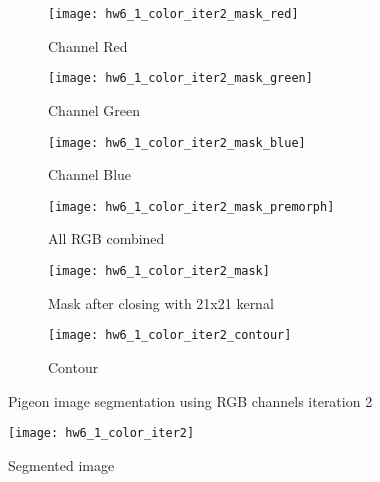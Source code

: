 \documentclass[11pt]{article}
\begin{document}
\begin{figure}[H]
\begin{subfigure}{.5\textwidth}
  \centering
  \texttt{[image: hw6\_1\_color\_iter2\_mask\_red]}
  \caption{Channel Red}
  \label{}
\end{subfigure}
\begin{subfigure}{.5\textwidth}
  \centering
  \texttt{[image: hw6\_1\_color\_iter2\_mask\_green]}
  \caption{Channel Green}
  \label{}
\end{subfigure}

\begin{subfigure}{.5\textwidth}
  \centering
  \texttt{[image: hw6\_1\_color\_iter2\_mask\_blue]}
  \caption{Channel Blue}
  \label{}
\end{subfigure}
\begin{subfigure}{.5\textwidth}
  \centering
  \texttt{[image: hw6\_1\_color\_iter2\_mask\_premorph]}
  \caption{All RGB combined}
  \label{}
\end{subfigure}

\begin{subfigure}{.5\textwidth}
  \centering
  \texttt{[image: hw6\_1\_color\_iter2\_mask]}
  \caption{Mask after closing with 21x21 kernal}
  \label{}
\end{subfigure}
\begin{subfigure}{.5\textwidth}
  \centering
  \texttt{[image: hw6\_1\_color\_iter2\_contour]}
  \caption{Contour}
  \label{}
\end{subfigure}

\caption{Pigeon image segmentation using RGB channels iteration 2}
\label{}
\end{figure}

\begin{figure}[H]
\centering
\texttt{[image: hw6\_1\_color\_iter2]}
\caption{Segmented image}
\label{}
\end{figure}
\end{document}
